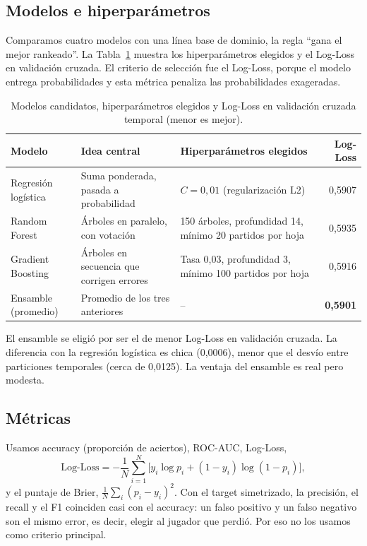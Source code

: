 \documentclass[11pt,a4paper]{article}
\begin{document}
\subsection{Modelos e hiperparámetros}

Comparamos cuatro modelos con una línea base de dominio, la regla ``gana el mejor rankeado''. La Tabla~\ref{tab:modelos} muestra los hiperparámetros elegidos y el Log-Loss en validación cruzada. El criterio de selección fue el Log-Loss, porque el modelo entrega probabilidades y esta métrica penaliza las probabilidades exageradas.

\begin{table}[H]
\centering
\caption{Modelos candidatos, hiperparámetros elegidos y Log-Loss en validación cruzada temporal (menor es mejor).}
\label{tab:modelos}
\begin{tabular}{llp{4.6cm}r}
\toprule
Modelo & Idea central & Hiperparámetros elegidos & Log-Loss \\
\midrule
Regresión logística & Suma ponderada, pasada a probabilidad & $C=0{,}01$ (regularización L2) & 0,5907 \\
Random Forest & Árboles en paralelo, con votación & 150 árboles, profundidad 14, mínimo 20 partidos por hoja & 0,5935 \\
Gradient Boosting & Árboles en secuencia que corrigen errores & Tasa 0,03, profundidad 3, mínimo 100 partidos por hoja & 0,5916 \\
Ensamble (promedio) & Promedio de los tres anteriores & -- & \textbf{0,5901} \\
\bottomrule
\end{tabular}
\end{table}

El ensamble se eligió por ser el de menor Log-Loss en validación cruzada. La diferencia con la regresión logística es chica (0,0006), menor que el desvío entre particiones temporales (cerca de 0,0125). La ventaja del ensamble es real pero modesta.

\subsection{Métricas}

Usamos accuracy (proporción de aciertos), ROC-AUC, Log-Loss,
\begin{equation}
  \text{Log-Loss} = -\frac{1}{N}\sum_{i=1}^{N}\big[y_i\log p_i + (1-y_i)\log(1-p_i)\big],
\end{equation}
y el puntaje de Brier, $\frac{1}{N}\sum_i (p_i - y_i)^2$. Con el target simetrizado, la precisión, el recall y el F1 coinciden casi con el accuracy: un falso positivo y un falso negativo son el mismo error, es decir, elegir al jugador que perdió. Por eso no los usamos como criterio principal.
\end{document}
